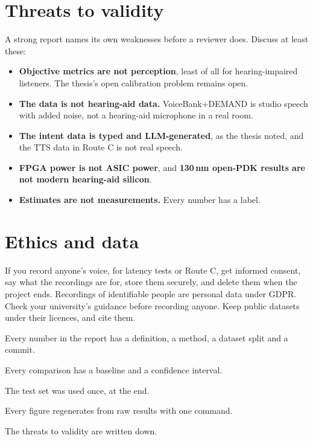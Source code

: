 \section{Threats to validity}\label{sec:eval:threats}

A strong report names its own weaknesses before a reviewer does. Discuss at
least these:
\begin{itemize}
  \item \textbf{Objective metrics are not perception}, least of all for
        hearing-impaired listeners. The thesis's open calibration problem
        remains open.
  \item \textbf{The data is not hearing-aid data.} VoiceBank+DEMAND is studio
        speech with added noise, not a hearing-aid microphone in a real room.
  \item \textbf{The intent data is typed and LLM-generated}, as the thesis
        noted, and the TTS data in Route C is not real speech.
  \item \textbf{FPGA power is not ASIC power}, and \textbf{130\,nm open-PDK
        results are not modern hearing-aid silicon}.
  \item \textbf{Estimates are not measurements.} Every number has a label.
\end{itemize}

\section{Ethics and data}\label{sec:eval:ethics}

If you record anyone's voice, for latency tests or Route C, get informed
consent, say what the recordings are for, store them securely, and delete them
when the project ends. Recordings of identifiable people are personal data under
GDPR. Check your university's guidance before recording anyone. Keep public
datasets under their licences, and cite them.

\begin{donebox}
\begin{checklist}
  \item Every number in the report has a definition, a method, a dataset split and a commit.
  \item Every comparison has a baseline and a confidence interval.
  \item The test set was used once, at the end.
  \item Every figure regenerates from raw results with one command.
  \item The threats to validity are written down.
\end{checklist}
\end{donebox}
